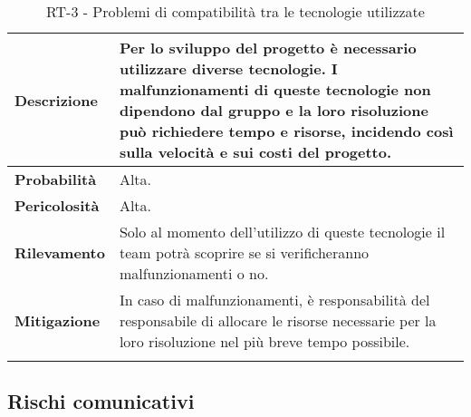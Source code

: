 
\begin{longtable}{ | l | p{12cm} | }
	\hline
	\textbf{Descrizione}  & Per lo sviluppo del progetto è necessario utilizzare diverse tecnologie. I malfunzionamenti di queste tecnologie non dipendono dal gruppo e la loro risoluzione può richiedere tempo e risorse, incidendo così sulla velocità e sui costi del progetto. \\
	\hline
	\textbf{Probabilità}  & Alta.                                                                                                                                                                                                                                                   \\
	\hline
	\textbf{Pericolosità} & Alta.                                                                                                                                                                                                                                                   \\
	\hline
	\textbf{Rilevamento}  & Solo al momento dell'utilizzo di queste tecnologie il team potrà scoprire se si verificheranno malfunzionamenti o no.                                                                                                                                   \\
	\hline
	\textbf{Mitigazione}  & In caso di malfunzionamenti, è responsabilità del responsabile di allocare le risorse necessarie per la loro risoluzione nel più breve tempo possibile.                                                                                                 \\
	\hline
	\caption{RT-3 - Problemi di compatibilità tra le tecnologie utilizzate}
\end{longtable}


\newpage


\subsection{Rischi comunicativi}


